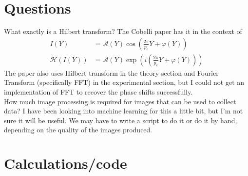 \documentclass[11pt]{article}
\begin{document}
\section*{Questions}

What exactly is a Hilbert transform? The Cobelli paper has it in the context of
\begin{align*}
I(Y) &= \mathcal{A}(Y)\cos \left(\frac{2\pi}{p_c}Y + \varphi (Y)\right)\\
\mathcal{H}\left(I(Y)\right) &= \mathcal{A}(Y) \exp\left( i\left( \frac{2\pi}{p_c} Y + \varphi(Y)\right)\right)
\end{align*}
The paper also uses Hilbert transform in the theory section and Fourier Transform (specifically FFT) in the experimental section, but I could not get an implementation of FFT to recover the phase shifts successfully.\\

How much image processing is required for images that can be used to collect data? I have been looking into machine learning for this a little bit, but I'm not sure it will be useful. We may have to write a script to do it or do it by hand, depending on the quality of the images produced.

\section*{Calculations/code}
\end{document}
